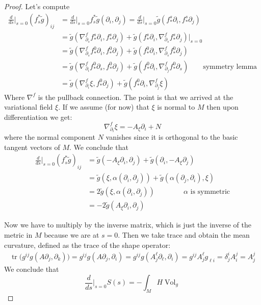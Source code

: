 \documentclass{book}
\begin{document}
\begin{proof}
Let's compute $$
\begin{aligned}
\frac{d}{ds}\Big|_{s=0}(f_s^*\tilde{g})_{ij}
&=\frac{d}{ds}\Big|_{s=0}f_s^*\tilde{g}
\left(\partial_i,\partial_j\right)
=\frac{d}{ds}\Big|_{s=0}\tilde{g}
(f^s_*\partial_i,f^s_*\partial_j)\\
&=\tilde{g}\left(\nabla^f_{\partial_s}
f^s_*\partial_i,f^s_*\partial_j\right)
+\tilde{g}
\left(f^s_*\partial_i,\nabla^f_{\partial_s}
f_*^s\partial_j\right)\Big|_{s=0}\\
&=\tilde{g}\left(\nabla^f_{\partial_s}
f^0_*\partial_i,f_*^0\partial_j\right)
+\tilde{g}\left(f^0_*\partial_i,
\nabla^f_{\partial_s}f_*^0\partial_j\right)\\
&=\tilde{g}\left(\nabla^f_{\partial_i}
f^0_*\partial_s,f_*^0\partial_j\right)
+\tilde{g}\left(f^0_*\partial_i,
\nabla^f_{\partial_j}f_*^0\partial_s\right)
\qquad  \text{symmetry lemma} \\
&=\tilde{g}(\nabla^f_{\partial_i}\xi,
f_*^0\partial_j)
+\tilde{g}(f^0_*\partial_i,
\nabla^f_{\partial_j}\xi)\end{aligned}
$$
Where
$\nabla^f$ is the pullback connection. The
point is that we arrived at the
variational field $\xi$. If we assume (for
now) that $\xi$ is normal to $M$ then
upon differentiation we get: $$
\nabla^f_{\partial_i}\xi=-A_{\xi}\partial_i+N
$$
where the normal component $N$ vanishes since
it is orthogonal to the basic
tangent vectors of $M$. We conclude that
$$
\begin{aligned}
\frac{d}{ds}\Big|_{s=0}(f_s^*\tilde{g})_{ij}
&=\tilde{g}\left(-A_{\xi}\partial_i,
\partial_j\right)
+\tilde{g}\left(\partial_i,-A_{\xi}
\partial_j\right)\\
&=\tilde{g}(\xi,\alpha(\partial_i,\partial_j)
)
+\tilde{g}(\alpha(\partial_j,\partial_i),\xi)
\\
&=2\tilde{g}(\xi,\alpha(\partial_i,
\partial_j))\qquad\qquad
\text{$\alpha$ is symmetric}\\
&=-2\tilde{g}(A_{\xi}\partial_i,\partial_j)
\end{aligned}
$$

Now we have to multiply by the inverse
matrix, which is just the inverse of the
metric in $M$ because we are at $s=0$. Then
we take trace and obtain the mean
curvature, defined as the trace of the shape
operator:
$$
\begin{aligned}
\operatorname{tr}\Big(g^{ij}g(A
\partial_j,\partial_k)\Big)
=g^{ij}g(A \partial_j,\partial_i)
=g^{ij}g(A^\ell_j\partial_\ell,\partial_i)
=g^{ij}A^\ell_jg_{\ell i}
=\delta^{i}_jA^j_i
=A^j_j
\end{aligned}
$$
We conclude that
$$
\frac{d}{ds}\Big|_{s=0}S(s)=-\int_M H
\operatorname{Vol}_{g}
$$
\end{proof}
\end{document}
